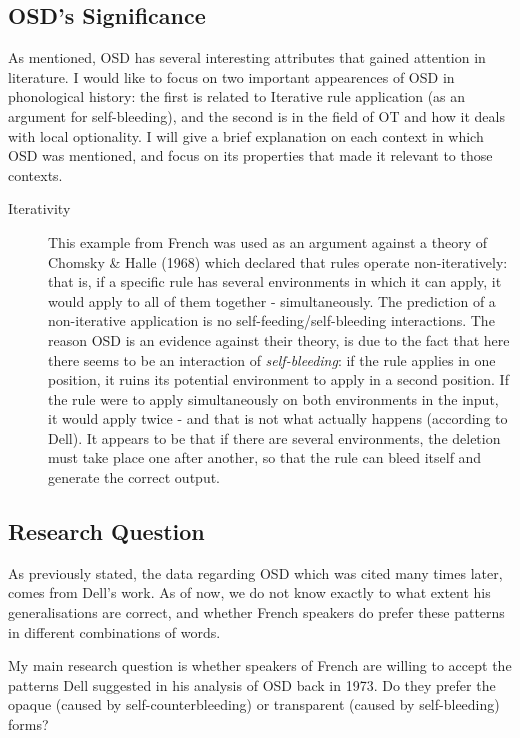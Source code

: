 \documentclass{article}
\begin{document}
\subsection{OSD's Significance} %
As mentioned, OSD has several interesting attributes that gained attention in literature.  I would like to focus on two important appearences of OSD in phonological history: the first is related to Iterative rule application (as an argument for self-bleeding),  and the second is in the field of OT and how it deals with local optionality. I will give a brief explanation on each context in which OSD was mentioned, and focus on its properties that made it relevant to those contexts.\\

\begin{description}
   \item[Iterativity] This example from French was used as an argument against a theory of Chomsky \& Halle (1968) which declared that rules operate non-iteratively: that is, if a specific rule has several environments in which it can apply, it would apply to all of them together - simultaneously.  The prediction of a non-iterative application is no self-feeding/self-bleeding interactions. The reason OSD is an evidence against their theory, is due to the fact that here there seems to be an interaction of \textit{self-bleeding}: if the rule applies in one position, it ruins its potential environment to apply in a second position. If the rule were to apply simultaneously on both environments in the input, it would apply twice - and that is not what actually happens (according to Dell). It appears to be that if there are several environments, the deletion must take place one after another, so that the rule can bleed itself and generate the correct output.
\end{description}

\subsection{Research Question}
As previously stated, the data regarding OSD which was cited many times later, comes from Dell's work. As of now, we do not know exactly to what extent his generalisations are correct, and whether French speakers do prefer these patterns in different combinations of words.

My main research question is whether speakers of French are willing to accept the patterns Dell suggested in his analysis of OSD back in 1973.  Do they prefer the opaque (caused by self-counterbleeding) or transparent (caused by self-bleeding) forms?
\end{document}
